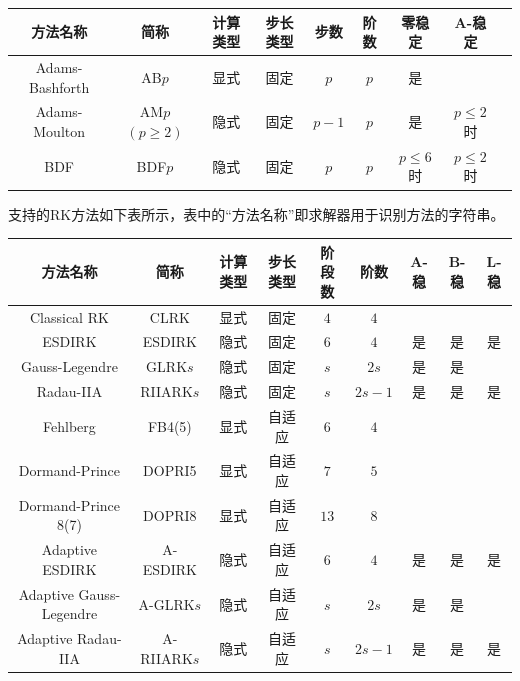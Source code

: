 \documentclass[lang=cn,10pt,bibend=bibtex]{elegantbook}
\begin{document}
\begin{table}[H]
  \centering
  \renewcommand\arraystretch{0.9}
  \begin{tabular}{cccc|cc|ccc}
    \small
  方法名称          & 简称        & 计算类型                   &  步长类型         & 步数 & 阶数  & 零稳定 & A-稳定   \\ \hline
  Adams-Bashforth  & AB$p$        & 显式                     &  固定        &  $p$   &  $p$    &   是   &              \\
  Adams-Moulton  & AM$p$\;\;$(p\geq 2)$   & 隐式                             &  固定        &  $p-1$   &  $p$    &   是   &   $p\leq 2$时     \\
  BDF  & BDF$p$     & 隐式           &  固定         &  $p$   &  $p$    &   $p\leq 6$时   &     $p\leq 2$时
  \end{tabular}
\end{table}
\vspace{-.8em}

支持的RK方法如下表所示，表中的“方法名称”即求解器用于识别方法的字符串。

\begin{table}[H]
  \centering
  \renewcommand\arraystretch{0.9}
  \begin{tabular}{cccc|cc|ccc}
    \small
  方法名称          & 简称         & 计算类型                  &  步长类型         & 阶段数 & 阶数  & A-稳 & B-稳 & L-稳  \\ \hline
  Classical RK  & CLRK           & 显式                  &  固定        &  $4$   &  $4$    &      &      &            \\
  ESDIRK  & ESDIRK & 隐式  &  固定        &  $6$   &  $4$    &   是   &   是   &    是   \\
  Gauss-Legendre  & GLRK$s$          & 隐式              &  固定         &  $s$   &  $2s$    &   是   &   是   &      \\
  Radau-IIA  & RIIARK$s$             & 隐式              &  固定         &  $s$   &  $2s-1$    &   是   &  是   &   是   \\
  Fehlberg  &  FB4(5)      & 显式    &  自适应       &  $6$   & $4$  &        &      &         \\
  Dormand-Prince  &  DOPRI5   & 显式       &  自适应       &  $7$   & $5$  &        &      &     \\    
  Dormand-Prince 8(7)  &  DOPRI8     & 显式     &  自适应       &  $13$   & $8$  &        &      &     \\    
  Adaptive ESDIRK  & A-ESDIRK & 隐式  &  自适应       &  $6$   &  $4$    &   是   &   是   &    是   \\
  Adaptive Gauss-Legendre & A-GLRK$s$  & 隐式                       &  自适应         &  $s$   &  $2s$    &   是   &   是   &      \\
  Adaptive Radau-IIA & A-RIIARK$s$     & 隐式                       &  自适应         &  $s$   &  $2s-1$    &   是   &  是   &   是   
  \end{tabular}
\end{table}
\vspace{-1em}
\end{document}
